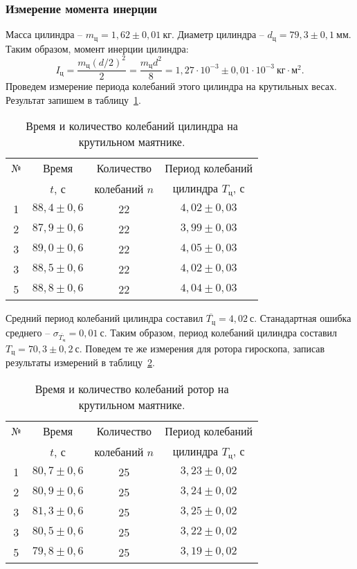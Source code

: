 \documentclass[a4paper,11pt]{article}
\begin{document}
\subsubsection{Измерение момента инерции} %
Масса цилиндра -- $m_{ц} = 1,62 \pm 0,01\ кг$.\newline
Диаметр цилиндра -- $d_{ц} = 79,3 \pm 0,1\ мм$.\newline
Таким образом, момент инерции цилиндра: $$I_{ц} = \frac{m_{ц}(d/2)^{2}}{2} = \frac{m_{ц}d^{2}}{8} = 1,27 \cdot 10^{-3} \pm 0,01 \cdot 10^{-3}\ кг \cdot м^{2}.$$
Проведем измерение периода колебаний этого цилиндра на крутильных весах. Результат запишем в таблицу~\ref{table:tab6}.
\begin{table}[h!]
\centering
\begin{tabular}{ ||c|c|c|c|| }
  \hline
  № & Время & Количество & Период колебаний \\
   & $t$, $с$ & колебаний $n$ & цилиндра $T_{ц}$, $с$ \\
  \hline
  1 & $88,4 \pm 0,6$ & 22 & $4,02 \pm 0,03$ \\
  2 & $87,9 \pm 0,6$ & 22 & $3,99 \pm 0,03$ \\
  3 & $89,0 \pm 0,6$ & 22 & $4,05 \pm 0,03$ \\
  3 & $88,5 \pm 0,6$ & 22 & $4,02 \pm 0,03$ \\
  5 & $88,8 \pm 0,6$ & 22 & $4,04 \pm 0,03$ \\
  \hline
\end{tabular}
\caption{Время и количество колебаний цилиндра на крутильном маятнике.}
\label{table:tab6}
\end{table}\newline
Средний период колебаний цилиндра составил $\overline{T_{ц}} = 4,02\ с$.\newline
Станадартная ошибка среднего -- $\sigma_{\overline{T_{ц}}}= 0,01\ с$.\newline
Таким образом, период колебаний цилиндра составил $T_{ц} = 70,3 \pm 0,2\ с$.\newline
Поведем те же измерения для ротора гироскопа, записав результаты измерений в таблицу~\ref{table:tab7}.
\begin{table}[h!]
\centering
\begin{tabular}{ ||c|c|c|c|| }
  \hline
  № & Время & Количество & Период колебаний \\
   & $t$, $с$ & колебаний $n$ & цилиндра $T_{ц}$, $с$ \\
  \hline
  1 & $80,7 \pm 0,6$ & 25 & $3,23 \pm 0,02$ \\
  2 & $80,9 \pm 0,6$ & 25 & $3,24 \pm 0,02$ \\
  3 & $81,3 \pm 0,6$ & 25 & $3,25 \pm 0,02$ \\
  3 & $80,5 \pm 0,6$ & 25 & $3,22 \pm 0,02$ \\
  5 & $79,8 \pm 0,6$ & 25 & $3,19 \pm 0,02$ \\
  \hline
\end{tabular}
\caption{Время и количество колебаний ротор на крутильном маятнике.}
\label{table:tab7}
\end{table}\newline
\end{document}

